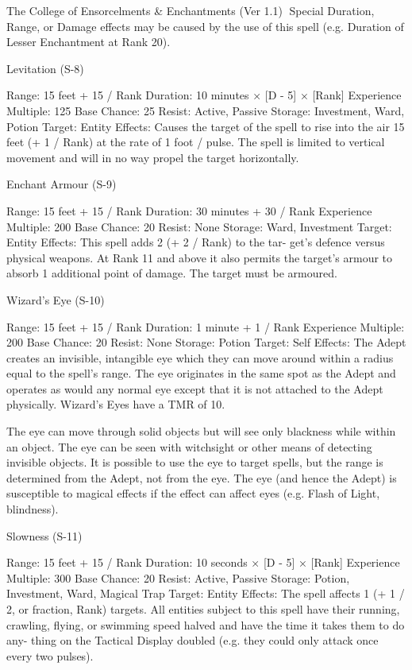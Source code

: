 \begin{Chapter}{The College of Ensorcelments \& Enchantments (Ver 1.1)}
Special  Duration,  Range,  or  Damage  effects  may 
be caused by the use of this spell (e.g. Duration of 
Lesser Enchantment at Rank 20). 

Levitation (S-8) 

Range: 15 feet + 15 / Rank 
Duration: 10 minutes × [D - 5] × [Rank] 
Experience Multiple: 125 
Base Chance: 25%
Resist: Active, Passive 
Storage: Investment, Ward, Potion 
Target: Entity 
Effects:  Causes  the  target  of  the  spell  to  rise  into 
the  air  15  feet  (+  1  /  Rank)  at  the  rate  of  1  foot  / 
pulse.  The  spell  is  limited  to  vertical  movement 
and will in no way propel the target horizontally. 

Enchant Armour (S-9) 

Range: 15 feet + 15 / Rank 
Duration: 30 minutes + 30 / Rank 
Experience Multiple: 200 
Base Chance: 20%
Resist: None 
Storage: Ward, Investment 
Target: Entity 
Effects:  This  spell  adds  2  (+  2  /  Rank)  to  the  tar-
get’s defence versus physical weapons. At Rank 11 
and  above  it  also  permits  the  target’s  armour  to 
absorb  1  additional  point  of  damage.  The  target 
must be armoured. 

Wizard’s Eye (S-10) 

Range: 15 feet + 15 / Rank 
Duration: 1 minute + 1 / Rank 
Experience Multiple: 200 
Base Chance: 20%
Resist: None 
Storage: Potion 
Target: Self 
Effects:  The  Adept  creates  an  invisible,  intangible 
eye  which  they  can  move  around  within  a  radius 
equal to the spell’s range. The eye originates in the 
same spot as the Adept and operates as would any 
normal  eye  except  that  it  is  not  attached  to  the 
Adept  physically.  Wizard’s  Eyes  have  a  TMR  of 
10. 

The  eye  can  move  through  solid  objects  but  will 
see only blackness while within an object. The eye 
can  be  seen  with  witchsight  or  other  means  of 
detecting invisible objects. It is possible to use the 
eye  to  target  spells,  but  the  range  is  determined 
from  the  Adept,  not  from  the  eye.  The  eye  (and 
hence the Adept) is susceptible to magical effects if 
the  effect  can  affect  eyes  (e.g.  Flash  of  Light, 
blindness). 

Slowness (S-11) 

Range: 15 feet + 15 / Rank 
Duration: 10 seconds × [D - 5] × [Rank] 
Experience Multiple: 300 
Base Chance: 20%
Resist: Active, Passive 
Storage: Potion, Investment, Ward, Magical Trap 
Target: Entity 
Effects:  The  spell  affects  1  (+  1  /  2,  or  fraction, 
Rank) targets. All entities subject to this spell have 
their running, crawling, flying, or swimming speed 
halved  and  have  the  time  it  takes  them to  do  any-
thing  on  the  Tactical  Display  doubled  (e.g.  they 
could only attack once every two pulses). 


\end{Chapter}
